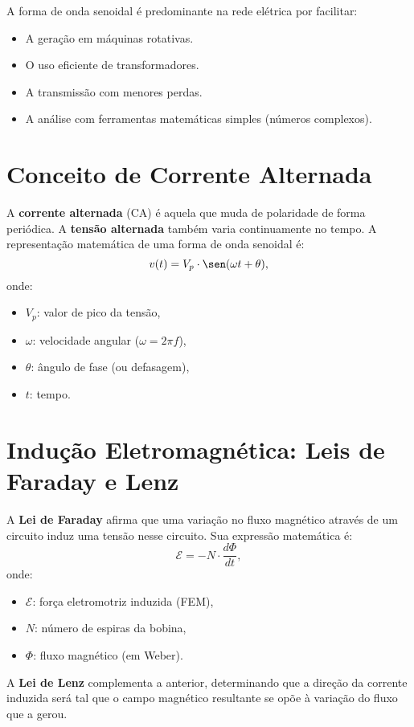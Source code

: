 A forma de onda senoidal é predominante na rede elétrica por facilitar:
\begin{itemize}
  \item A geração em máquinas rotativas.
  \item O uso eficiente de transformadores.
  \item A transmissão com menores perdas.
  \item A análise com ferramentas matemáticas simples (números complexos).
\end{itemize}

\section{Conceito de Corrente Alternada}

A \textbf{corrente alternada} (CA) é aquela que muda de polaridade de forma periódica. A \textbf{tensão alternada} também varia continuamente no tempo. A representação matemática de uma forma de onda senoidal é:
\[
v(t) = V_p \cdot \sen(\omega t + \theta),
\]
onde:
\begin{itemize}
  \item \(V_p\): valor de pico da tensão,
  \item \(\omega\): velocidade angular (\(\omega = 2\pi f\)),
  \item \(\theta\): ângulo de fase (ou defasagem),
  \item \(t\): tempo.
\end{itemize}

\section{Indução Eletromagnética: Leis de Faraday e Lenz}

A \textbf{Lei de Faraday} afirma que uma variação no fluxo magnético através de um circuito induz uma tensão nesse circuito. Sua expressão matemática é:
\[
\mathcal{E} = -N \cdot \frac{d\Phi}{dt},
\]
onde:
\begin{itemize}
  \item \(\mathcal{E}\): força eletromotriz induzida (FEM),
  \item \(N\): número de espiras da bobina,
  \item \(\Phi\): fluxo magnético (em Weber).
\end{itemize}

A \textbf{Lei de Lenz} complementa a anterior, determinando que a direção da corrente induzida será tal que o campo magnético resultante se opõe à variação do fluxo que a gerou.


